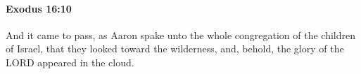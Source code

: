 
		\paragraph{Exodus 16:10} %
			\label{EXODUS-16-10}

			And it came to pass, as Aaron spake unto the whole congregation of the children of Israel, that they looked toward the wilderness, and, behold, the glory of the LORD appeared in the cloud.



